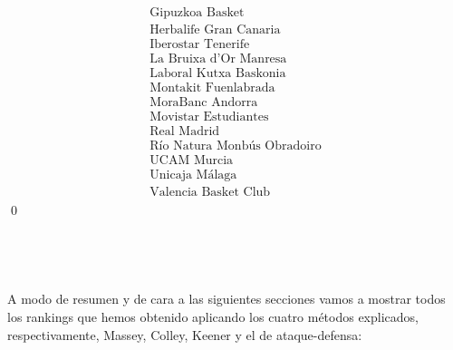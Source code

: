 \[\begin{array}{ccc}
\begin{array}{c}
		\text{Gipuzkoa Basket} \\
		\text{Herbalife Gran Canaria} \\
		\text{Iberostar Tenerife} \\
		\text{La Bruixa d'Or Manresa} \\
		\text{Laboral Kutxa Baskonia} \\
		\text{Montakit Fuenlabrada} \\
		\text{MoraBanc Andorra} \\
		\text{Movistar Estudiantes} \\
		\text{Real Madrid} \\
		\text{Río Natura Monbús Obradoiro} \\
		\text{UCAM Murcia} \\
		\text{Unicaja Málaga} \\
		\text{Valencia Basket Club}
		\end{array}
		\end{array}
		\]
\qed
  \ \\ \ \\ \ \\ \ \\ \ \\ 
A modo de resumen y de cara a las siguientes secciones vamos a mostrar todos los rankings que hemos obtenido aplicando los cuatro métodos explicados, respectivamente, Massey, Colley, Keener y el de ataque-defensa:

